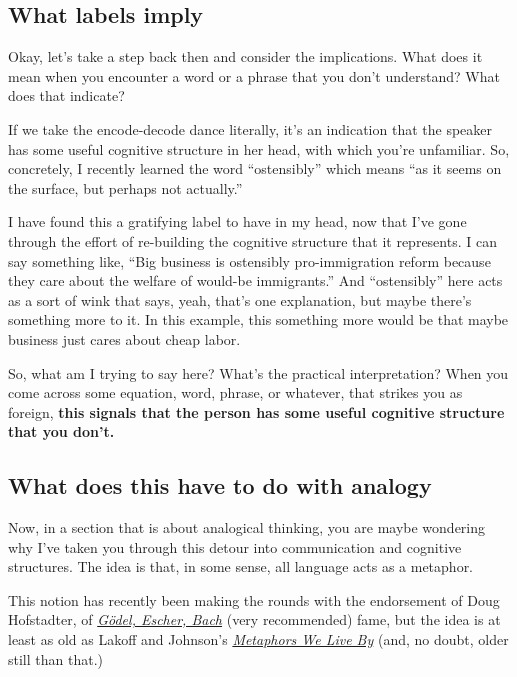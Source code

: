 \subsection{What labels imply}\label{what-labels-imply}

Okay, let's take a step back then and consider the implications. What
does it mean when you encounter a word or a phrase that you don't
understand? What does that indicate?

If we take the encode-decode dance literally, it's an indication that
the speaker has some useful cognitive structure in her head, with which
you're unfamiliar. So, concretely, I recently learned the word
``ostensibly'' which means ``as it seems on the surface, but perhaps not
actually.''

I have found this a gratifying label to have in my head, now that I've
gone through the effort of re-building the cognitive structure that it
represents. I can say something like, ``Big business is ostensibly
pro-immigration reform because they care about the welfare of would-be
immigrants.'' And ``ostensibly'' here acts as a sort of wink that says,
yeah, that's one explanation, but maybe there's something more to it. In
this example, this something more would be that maybe business just
cares about cheap labor.

So, what am I trying to say here? What's the practical interpretation?
When you come across some equation, word, phrase, or whatever, that
strikes you as foreign, \textbf{this signals that the person has some
useful cognitive structure that you don't.}

\subsection{What does this have to do with
analogy}\label{what-does-this-have-to-do-with-analogy}

Now, in a section that is about analogical thinking, you are maybe
wondering why I've taken you through this detour into communication and
cognitive structures. The idea is that, in some sense, all language acts
as a metaphor.

This notion has recently been making the rounds with the endorsement of
Doug Hofstadter, of
\href{http://www.amazon.com/gp/product/0465026567/ref=as_li_tl?ie=UTF8\&camp=1789\&creative=390957\&creativeASIN=0465026567\&linkCode=as2\&tag=rsio-20}{\emph{Gödel,
Escher, Bach}} (very recommended) fame, but the idea is at least as old
as Lakoff and Johnson's
\href{http://www.amazon.com/gp/product/0226468011/ref=as_li_tl?ie=UTF8\&camp=1789\&creative=390957\&creativeASIN=0226468011\&linkCode=as2\&tag=rsio-20}{\emph{Metaphors
We Live By}} (and, no doubt, older still than that.)

